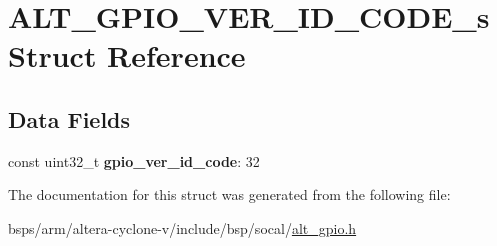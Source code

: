 \hypertarget{structALT__GPIO__VER__ID__CODE__s}{}\section{A\+L\+T\+\_\+\+G\+P\+I\+O\+\_\+\+V\+E\+R\+\_\+\+I\+D\+\_\+\+C\+O\+D\+E\+\_\+s Struct Reference}
\label{structALT__GPIO__VER__ID__CODE__s}
\subsection*{Data Fields}
\begin{DoxyCompactItemize}
\item 
\mbox{\label{structALT__GPIO__VER__ID__CODE__s_a43e691d08637cfe27b197cb579c48582}} 
const uint32\+\_\+t {\bfseries gpio\+\_\+ver\+\_\+id\+\_\+code}\+: 32
\end{DoxyCompactItemize}


The documentation for this struct was generated from the following file\+:\begin{DoxyCompactItemize}
\item 
bsps/arm/altera-\/cyclone-\/v/include/bsp/socal/\mbox{\hyperlink{alt__gpio_8h}{alt\+\_\+gpio.\+h}}\end{DoxyCompactItemize}
